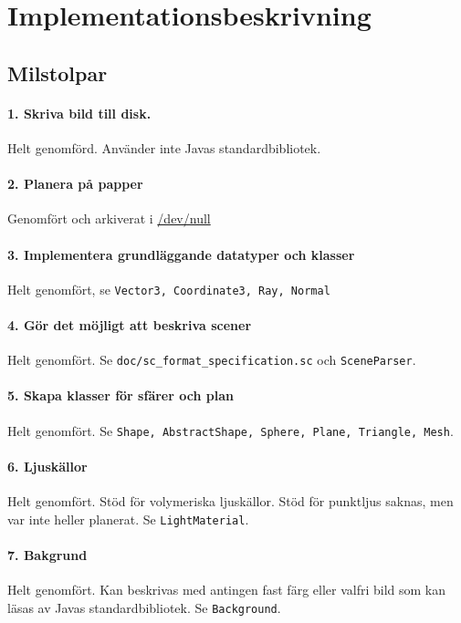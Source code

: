 \documentclass{article}
\begin{document}
\section{Implementationsbeskrivning}
\subsection{Milstolpar}
\paragraph{1. Skriva bild till disk.}
Helt genomförd. Använder inte Javas standardbibliotek.

\paragraph{2. Planera på papper}
Genomfört och arkiverat i \url{/dev/null}

\paragraph{3. Implementera grundläggande datatyper och klasser}
Helt genomfört, se \texttt{Vector3, Coordinate3, Ray, Normal}

\paragraph{4. Gör det möjligt att beskriva scener}
Helt genomfört. Se \texttt{doc/sc\_format\_specification.sc} och
\texttt{SceneParser}.

\paragraph{5. Skapa klasser för sfärer och plan}
Helt genomfört. Se \texttt{Shape, AbstractShape, Sphere, Plane, Triangle, Mesh}.

\paragraph{6. Ljuskällor}
Helt genomfört. Stöd för volymeriska ljuskällor. Stöd för punktljus
saknas, men var inte heller planerat. Se \texttt{LightMaterial}.

\paragraph{7. Bakgrund}
Helt genomfört. Kan beskrivas med antingen fast färg eller valfri bild
som kan läsas av Javas standardbibliotek. Se \texttt{Background}.
\end{document}
